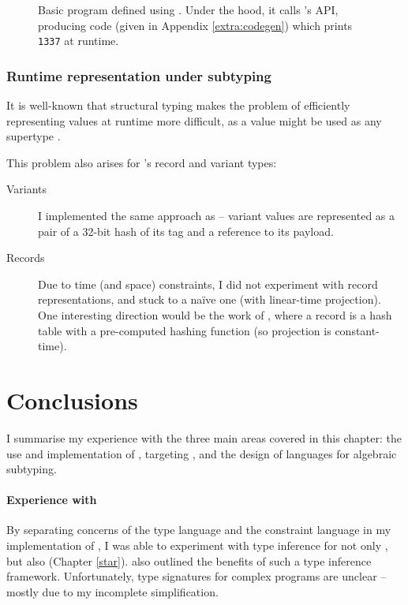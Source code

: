 \begin{figure}[p]
    \centering
    
    \caption{Basic program defined using \binaryendsl{}. Under the hood, it calls \binaryen{}'s API, producing \wasm{} code (given in Appendix \ref{extra:codegen}) which prints \texttt{1337} at runtime.}
    \label{fig:binaryer-example}
\end{figure}

\subsubsection{Runtime representation under subtyping}

It is well-known that structural typing makes the problem of efficiently representing values at runtime more difficult, as a value might be used as any supertype \cite{tapl}. 

This problem also arises for \fabric{}'s record and variant types: 
\begin{description}
    \item[Variants] I implemented the same approach as \textcite{polymorphic-variants} -- variant values are represented as a pair of a 32-bit hash of its tag and a reference to its payload.
    \item[Records] Due to time (and space) constraints, I did not experiment with record representations, and stuck to a na\"ive one (with linear-time projection). One interesting direction would be the work of \textcite{remy-extensible-records}, where a record is a hash table with a pre-computed hashing function (so projection is constant-time). 
\end{description}

\section{Conclusions}

I summarise my experience with the three main areas covered in this chapter: the use and implementation of \inference{}, targeting \wasm{}, and the design of languages for algebraic subtyping. 

\paragraph{Experience with \inference{}}
By separating concerns of the type language and the constraint language in my implementation of \compiler{}, I was able to experiment with type inference for not only \fabric{}, but also \starr{} (Chapter \ref{star}). \textcite{pottier-framework} also outlined the benefits of such a type inference framework. Unfortunately, type signatures for complex programs are unclear -- mostly due to my incomplete simplification. 


